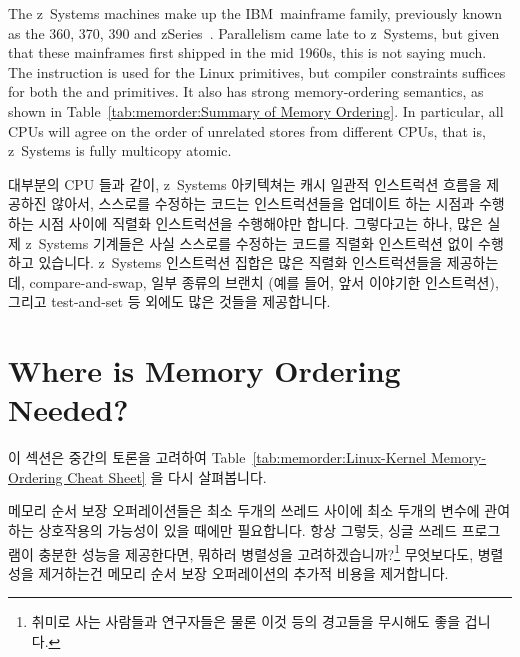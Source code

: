 The z~Systems machines make up the IBM\mytexttrademark\
mainframe family, previously
known as the 360, 370, 390 and zSeries~\cite{IBMzSeries04a}.
Parallelism came late to z~Systems, but given that these mainframes first
shipped in the mid 1960s, this is not saying much.
The  instruction is used for the Linux  primitives,
but compiler constraints suffices for both the
 and  primitives.
It also has strong memory-ordering semantics, as shown in
Table~\ref{tab:memorder:Summary of Memory Ordering}.
In particular, all CPUs
will agree on the order of unrelated stores from different CPUs,
that is, z~Systems is fully multicopy atomic.
\fi

대부분의 CPU 들과 같이, z~Systems 아키텍쳐는 캐시 일관적 인스트럭션 흐름을
제공하진 않아서, 스스로를 수정하는 코드는 인스트럭션들을 업데이트 하는 시점과
수행하는 시점 사이에 직렬화 인스트럭션을 수행해야만 합니다.
그렇다고는 하나, 많은 실제 z~Systems 기계들은 사실 스스로를 수정하는 코드를
직렬화 인스트럭션 없이 수행하고 있습니다.
z~Systems 인스트럭션 집합은 많은 직렬화 인스트럭션들을 제공하는데,
compare-and-swap, 일부 종류의 브랜치 (예를 들어, 앞서 이야기한 
인스트럭션), 그리고 test-and-set 등 외에도 많은 것들을 제공합니다.

\section{Where is Memory Ordering Needed?}
\label{sec:memorder:Where is Memory Ordering Needed?}

이 섹션은 중간의 토론을 고려하여
Table~\ref{tab:memorder:Linux-Kernel Memory-Ordering Cheat Sheet}
을 다시 살펴봅니다.

메모리 순서 보장 오퍼레이션들은 최소 두개의 쓰레드 사이에 최소 두개의 변수에
관여하는 상호작용의 가능성이 있을 때에만 필요합니다.
항상 그렇듯, 싱글 쓰레드 프로그램이 충분한 성능을 제공한다면, 뭐하러 병렬성을
고려하겠습니까?\footnote{
	취미로 사는 사람들과 연구자들은 물론 이것 등의 경고들을 무시해도
	좋을 겁니다.}
무엇보다도, 병렬성을 제거하는건 메모리 순서 보장 오퍼레이션의 추가적 비용을
제거합니다.

